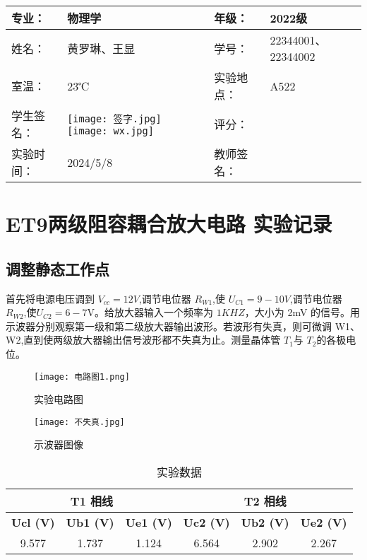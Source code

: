\documentclass[dvipsnames, svgnames,a4paper,11pt]{article}
\begin{document}
	
	
	
	\clearpage
	
	\begin{table}
		\renewcommand\arraystretch{1.7}
		\centering
		\begin{tabularx}{\textwidth}{|X|X|X|X|}
			\hline
			专业： & 物理学 & 年级： & 2022级 \\
			\hline
			姓名： & 黄罗琳、王显 & 学号： &22344001、22344002 \\
			\hline
			室温： &23℃  & 实验地点： & A522 \\
			\hline
			学生签名：& \texttt{[image: 签字.jpg]} \texttt{[image: wx.jpg]} & 评分： &\\
			\hline
			实验时间：& 2024/5/8 & 教师签名：&\\
			\hline
		\end{tabularx}
	\end{table}
	
	\section{ET9两级阻容耦合放大电路 \quad\heiti 实验记录}
	
	\subsection{调整静态工作点}
	首先将电源电压调到 $V_{cc}=12V$,调节电位器 $R_{W1}$,使
$U_{C1}=9-10V$,调节电位器 $R_{W2}$,使$U_{C2}=6-7$V。给放大器输入一个频率为
$1KHZ$，大小为 2mV 的信号。用示波器分别观察第一级和第二级放大器输出波形。若波形有失真，则可微调 W1、W2,直到使两级放大器输出信号波形都不失真为止。测量晶体管 $T_1$与 $T_2$的各极电位。
	\begin{figure}[{H}]
		\centering
		\texttt{[image: 电路图1.png]}
		\caption{实验电路图}
		\label{}
	\end{figure}
	\begin{figure}[{H}]
		\centering
		\texttt{[image: 不失真.jpg]}
		\caption{示波器图像}
		\label{}
	\end{figure}
	\begin{table}[h]
		\centering
		\caption{实验数据}
	\begin{tabular}{|c|c|c|c|c|c|}
	
		\hline
		  \multicolumn{3}{|c|}{\textbf{T1 相线}} & \multicolumn{3}{|c|}{\textbf{T2 相线}}\\
		\hline
		\textbf{Ucl (V)} & \textbf{Ub1 (V)} & \textbf{Ue1 (V)} & \textbf{Uc2 (V)} & \textbf{Ub2 (V)}&  \textbf{Ue2 (V)}\\
		\hline
		9.577&1.737 &1.124 &6.564 &2.902 &2.267\\
		\hline
		\end{tabular}
	\end{table}
\end{document}
